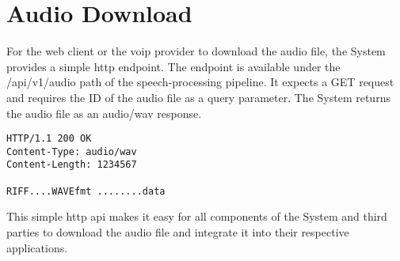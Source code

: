 \section{Audio Download}

For the web client or the \ac{voip} provider to download the audio file, the System provides a simple \ac{http} 
endpoint. The endpoint is available under the /api/v1/audio path of the speech-processing pipeline. It expects a GET 
request and requires the ID of the audio file as a query parameter. The System returns the audio file as an 
audio/wav response.

\begin{verbatim}
HTTP/1.1 200 OK
Content-Type: audio/wav
Content-Length: 1234567

RIFF....WAVEfmt ........data
\end{verbatim}

This simple \ac{http} \ac{api} makes it easy for all components of the System and third parties to download the audio 
file and integrate it into their respective applications.
